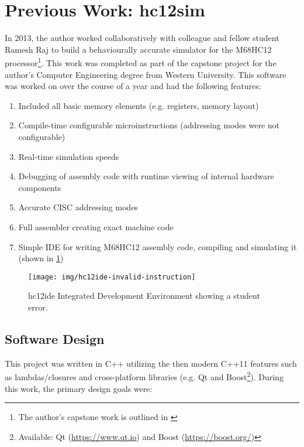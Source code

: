 \section{Previous Work: hc12sim}

In 2013, the author worked collaboratively with colleague and fellow student Ramesh Raj to build a behaviourally accurate simulator for the M68HC12 processor\footnote{The author's capstone work is outlined in \cite{Brightwell2013}}. This work was completed as part of the capstone project for the author's Computer Engineering degree from Western University. This software was worked on over the course of a year and had the following features: 

\begin{enumerate}
    \item Included all basic memory elements (e.g. registers, memory layout)
    \item Compile-time configurable microinstructions (addressing modes were not configurable)
    \item Real-time simulation speeds
    \item Debugging of assembly code with runtime viewing of internal hardware components
    \item Accurate CISC addressing modes 
    \item Full assembler creating exact machine code
    \item Simple IDE for writing M68HC12 assembly code, compiling and simulating it (shown in \cref{fig:hc12ide-invalid-instruction})
\end{enumerate}

\begin{figure}[!ht]
    \centering
    \texttt{[image: img/hc12ide-invalid-instruction]}
    \caption{hc12ide Integrated Development Environment showing a student error.}
    \label{fig:hc12ide-invalid-instruction}
\end{figure}

\subsection{Software Design}

This project was written in C++ utilizing the then modern C++11 features such as lambdas/closures and cross-platform libraries (e.g. Qt and Boost\footnote{Available: Qt (\url{https://www.qt.io}) and Boost (\url{https://boost.org/})}). During this work, the primary design goals were: 

